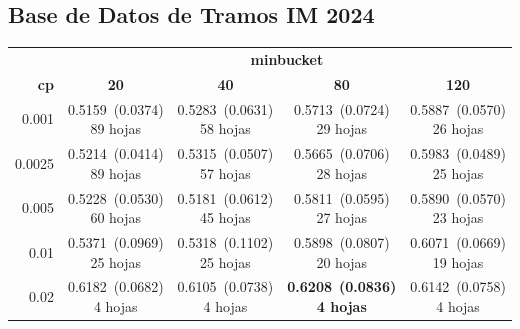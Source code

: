 \documentclass[twoside,a4paper,12pt,onecolumn,openany]{book}
\begin{document}
\vspace{0.1cm}
 
\subsection*{Base de Datos de Tramos IM 2024}
 
\begin{table}[H]
\centering
\small
\setlength{\tabcolsep}{4pt}
\begin{tabular}{r|cccc}
\toprule
 & \multicolumn{4}{c}{\textbf{minbucket}} \\
\cmidrule(lr){2-5}
\textbf{cp} & \textbf{20} & \textbf{40} & \textbf{80} & \textbf{120} \\
\midrule
0.001 & \shortstack{0.5159~(0.0374)\\ 89 hojas} & \shortstack{0.5283~(0.0631)\\ 58 hojas} & \shortstack{0.5713~(0.0724)\\ 29 hojas} & \shortstack{0.5887~(0.0570)\\ 26 hojas} \\[4pt]
0.0025 & \shortstack{0.5214~(0.0414)\\ 89 hojas} & \shortstack{0.5315~(0.0507)\\ 57 hojas} & \shortstack{0.5665~(0.0706)\\ 28 hojas} & \shortstack{0.5983~(0.0489)\\ 25 hojas} \\[4pt]
0.005 & \shortstack{0.5228~(0.0530)\\ 60 hojas} & \shortstack{0.5181~(0.0612)\\ 45 hojas} & \shortstack{0.5811~(0.0595)\\ 27 hojas} & \shortstack{0.5890~(0.0570)\\ 23 hojas} \\[4pt]
0.01 & \shortstack{0.5371~(0.0969)\\ 25 hojas} & \shortstack{0.5318~(0.1102)\\ 25 hojas} & \shortstack{0.5898~(0.0807)\\ 20 hojas} & \shortstack{0.6071~(0.0669)\\ 19 hojas} \\[4pt]
0.02 & \shortstack{0.6182~(0.0682)\\ 4 hojas} & \shortstack{0.6105~(0.0738)\\ 4 hojas} & \shortstack{\textbf{0.6208}~\textbf{(0.0836)}\\ \textbf{4 hojas}} & \shortstack{0.6142~(0.0758)\\ 4 hojas} \\[4pt]

\end{tabular}
\end{table}
\end{document}
